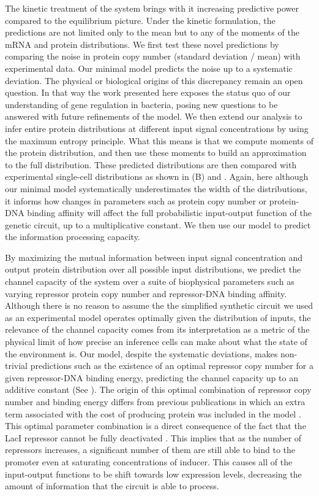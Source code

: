 The kinetic treatment of the system brings with it increasing predictive power
compared to the equilibrium picture. Under the kinetic formulation, the
predictions are not limited only to the mean but to any of the moments of the
mRNA and protein distributions. We first test these novel predictions by
comparing the noise in protein copy number (standard deviation / mean) with
experimental data. Our minimal model predicts the noise up to a systematic
deviation. The physical or biological origins of this discrepancy remain an
open question. In that way the work presented here exposes the status quo of
our understanding of gene regulation in bacteria, posing new questions to be
answered with future refinements of the model. We then extend our analysis to
infer entire protein distributions at different input signal concentrations by
using the maximum entropy principle. What this means is that we compute moments
of the protein distribution, and then use these moments to build an
approximation to the full distribution. These predicted distributions are then
compared with experimental single-cell distributions as shown in
(B) and . Again, here although our minimal
model systematically underestimates the width of the distributions, it informs
how changes in parameters such as protein copy number or protein-DNA binding
affinity will affect the full probabilistic input-output function of the genetic
circuit, up to a multiplicative constant. We then use our model to predict the
information processing capacity.

By maximizing the mutual information between input signal concentration and
output protein distribution over all possible input distributions, we predict
the channel capacity of the system over a suite of biophysical parameters such
as varying repressor protein copy number and repressor-DNA binding affinity.
Although there is no reason to assume the the simplified synthetic circuit we
used as an experimental model operates optimally given the distribution of
inputs, the relevance of the channel capacity comes from its interpretation as
a metric of the physical limit of how precise an inference cells can
make about what the state of the environment is. Our model, despite the
systematic deviations, makes non-trivial predictions such as the existence of
an optimal repressor copy number for a given repressor-DNA binding energy,
predicting the channel capacity up to an additive constant (See
). The origin of this optimal combination of repressor copy
number and binding energy differs from previous publications in which an extra
term associated with the cost of producing protein was included in the model
\cite{Tkacik2011}. This optimal parameter combination is a direct consequence
of the fact that the LacI repressor cannot be fully deactivated
\cite{Razo-Mejia2018}. This implies that as the number of repressors increases,
a significant number of them are still able to bind to the promoter even at
saturating concentrations of inducer. This causes all of the input-output
functions to be shift towards low expression levels, decreasing the amount of
information that the circuit is able to process.

